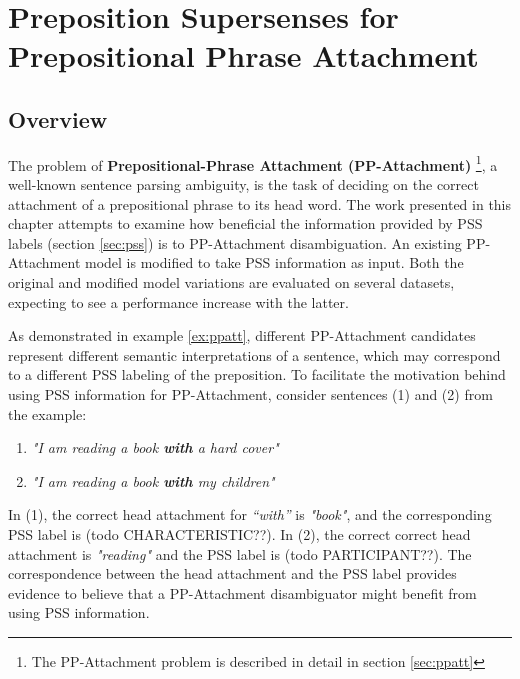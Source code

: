 
\chapter{Preposition Supersenses for  Prepositional Phrase Attachment} %

\label{Chapter3} %


\section{Overview}

The problem of \textbf{Prepositional-Phrase Attachment (PP-Attachment)} \footnote{The PP-Attachment problem is described in detail in section \ref{sec:ppatt}}, a well-known sentence parsing ambiguity, is the task of deciding on the correct attachment of a prepositional phrase to its head word. The work presented in this chapter attempts to examine how beneficial the information provided by PSS labels (section \ref{sec:pss}) is to PP-Attachment disambiguation. An existing PP-Attachment model is modified to take PSS information as input. Both the original and modified model variations are evaluated on several datasets, expecting to see a performance increase with the latter. 

As demonstrated in example \ref{ex:ppatt}, different PP-Attachment candidates represent different semantic interpretations of a sentence, which may correspond to a different PSS labeling of the preposition. To facilitate the motivation behind using PSS information for PP-Attachment, consider sentences (1) and (2) from the example:

\begin{enumerate} \label{ex:ppatt}
    \item[1.] \emph{"I am reading a book \textbf{with} a hard cover"}
    \item[2.] \emph{"I am reading a book \textbf{with} my children"}
\end{enumerate}

In (1), the correct head attachment for \textit{“with”} is \textit{"book"}, and the corresponding PSS label is (todo CHARACTERISTIC??). In (2), the correct correct head attachment is \textit{"reading"} and the PSS label is (todo PARTICIPANT??). The correspondence between the head attachment and the PSS label provides evidence to believe that a PP-Attachment disambiguator might benefit from using PSS information. 

